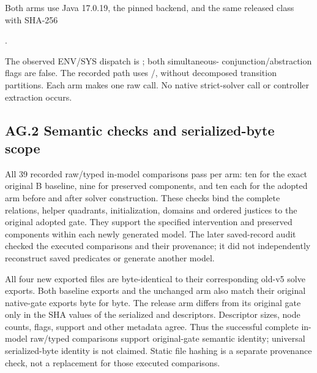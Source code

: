 Both arms use Java 17.0.19, the pinned
 backend, and the same released
 class with SHA-256
\begin{center}\small
{}.
\end{center}
The observed ENV/SYS dispatch is ; both simultaneous-
conjunction/abstraction flags are false. The recorded path uses
/, without decomposed
transition partitions. Each arm makes one raw
 call. No native strict-solver call or
controller extraction occurs.

\subsection*{AG.2 Semantic checks and serialized-byte scope}
All 39 recorded raw/typed in-model comparisons pass per arm: ten for the
exact original B baseline, nine for preserved components, and ten each
for the adopted arm before and after solver construction. These checks
bind the complete relations, helper quadrants, initialization, domains
and ordered justices to the original adopted gate. They support the
specified intervention and preserved components within each newly
generated model. The later saved-record audit checked the executed
comparisons and their provenance; it did not independently reconstruct
saved predicates or generate another model.

All four new exported  files are byte-identical to their
corresponding old-v5 solve exports. Both baseline exports and the
unchanged arm also match their original native-gate exports byte for
byte. The release arm differs from its original gate only in the SHA
values of the serialized  and 
descriptors. Descriptor sizes, node counts, flags, support and other
metadata agree. Thus the successful complete in-model raw/typed
comparisons support original-gate semantic identity; universal
serialized-byte identity is not claimed. Static file hashing is a
separate provenance check, not a replacement for those executed comparisons.

